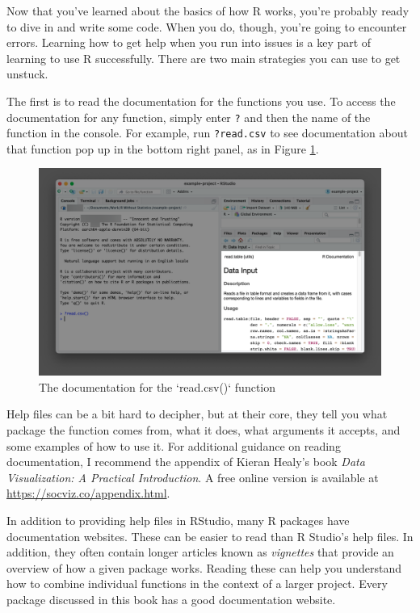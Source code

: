 \documentclass[
]{book}
\begin{document}
Now that you've learned about the basics of how R works, you're probably ready to dive in and write some code. When you do, though, you're going to encounter errors. Learning how to get help when you run into issues is a key part of learning to use R successfully. There are two main strategies you can use to get unstuck.

The first is to read the documentation for the functions you use. To access the documentation for any function, simply enter \texttt{?} and then the name of the function in the console. For example, run \texttt{?read.csv} to see documentation about that function pop up in the bottom right panel, as in Figure \ref{fig:readcsv-documentation}.

\begin{figure}
\includegraphics[width=1\linewidth]{assets/readcsv-documentation} \caption{The documentation for the `read.csv()` function}\label{fig:readcsv-documentation}
\end{figure}

Help files can be a bit hard to decipher, but at their core, they tell you what package the function comes from, what it does, what arguments it accepts, and some examples of how to use it. For additional guidance on reading documentation, I recommend the appendix of Kieran Healy's book \emph{Data Visualization: A Practical Introduction}. A free online version is available at \url{https://socviz.co/appendix.html}.

In addition to providing help files in RStudio, many R packages have documentation websites. These can be easier to read than R Studio's help files. In addition, they often contain longer articles known as \emph{vignettes} that provide an overview of how a given package works. Reading these can help you understand how to combine individual functions in the context of a larger project. Every package discussed in this book has a good documentation website.
\end{document}
